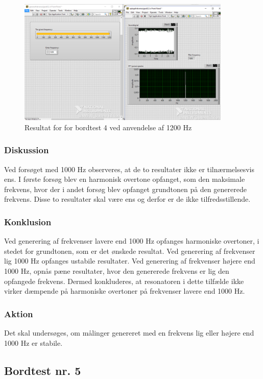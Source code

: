			\begin{figure}[htb]
			\centering
				\includegraphics[width=4in]{Bordtest41200Hz}
				\caption{Resultat for for bordtest 4 ved anvendelse af 1200 Hz}	
				\label{fig:bt41200}
			\end{figure} 
	
			  
			\subsubsection{Diskussion}
			Ved forsøget med 1000 Hz observeres, at de to resultater ikke er tilnærmelsesvis ens. I første forsøg blev en harmonisk overtone opfanget, som den maksimale frekvens, hvor der i andet forsøg blev opfanget grundtonen på den genererede frekvens. Disse to resultater skal være ens og derfor er de ikke tilfredsstillende.
			
			\subsubsection{Konklusion}
			Ved generering af frekvenser lavere end 1000 Hz opfanges harmoniske overtoner, i stedet for grundtonen, som er det ønskede resultat. 
			Ved generering af frekvenser lig 1000 Hz opfanges ustabile resultater. 
			Ved generering af frekvenser højere end 1000 Hz, opnås pæne resultater, hvor den genererede frekvens er lig den opfangede frekvens.  
			Dermed konkluderes, at resonatoren i dette tilfælde ikke virker dæmpende på harmoniske overtoner på frekvenser lavere end 1000 Hz. 
			  
			\subsubsection{Aktion}
			Det skal undersøges, om målinger genereret med en frekvens lig eller højere end 1000 Hz er stabile. 
			
			\subsection{Bordtest nr. 5} %
